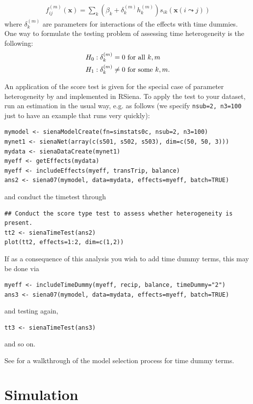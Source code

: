 \documentclass[a4paper,fleqn]{article}
\newcommand{\+}{\, + \,}
\begin{document}
{\begin{align}
f^{(m)}_{ij}(\mathbf{x})= \sum_k (\beta_k + \delta_k^{(m)} h_k^{(m)})
s_{ik}(\mathbf{x}(i \leadsto j))
\label{eq:fmij}
\end{align}
where $\delta_k^{(m)}$ are parameters for interactions of the effects
with time dummies. One way
to formulate the testing problem of assessing time heterogeneity is the
following:
\begin{align}
H_0:\delta_k^{(m)} = 0 & \mbox{~for all~} k,m \notag\\
H_1:\delta_k^{(m)} \neq 0 & \mbox{ for some } k,m .
\label{hyptest}
\end{align}

An application of the score test is given for the special case of parameter
heterogeneity by \citet{Lospinoso2010a} and implemented in RSiena.  To apply the
test to your dataset, run an estimation in the usual way, e.g. as follows
(we specify \texttt{nsub=2, n3=100} just to have an example that runs
very quickly):
\begin{verbatim}
mymodel <- sienaModelCreate(fn=simstats0c, nsub=2, n3=100)
mynet1 <- sienaNet(array(c(s501, s502, s503), dim=c(50, 50, 3)))
mydata <- sienaDataCreate(mynet1)
myeff <- getEffects(mydata)
myeff <- includeEffects(myeff, transTrip, balance)
ans2 <- siena07(mymodel, data=mydata, effects=myeff, batch=TRUE)
\end{verbatim}
and conduct the timetest through
\begin{verbatim}
## Conduct the score type test to assess whether heterogeneity is present.
tt2 <- sienaTimeTest(ans2)
plot(tt2, effects=1:2, dim=c(1,2))
\end{verbatim}
If as a consequence of this analysis you wish to add time dummy terms,
this may be done via
\begin{verbatim}
myeff <- includeTimeDummy(myeff, recip, balance, timeDummy="2")
ans3 <- siena07(mymodel, data=mydata, effects=myeff, batch=TRUE)
\end{verbatim}
and testing again,
\begin{verbatim}
tt3 <- sienaTimeTest(ans3)
\end{verbatim}
and so on.

See \citet{Lospinoso2010b} for a walkthrough of the model selection process
for time dummy terms.

\begin{print}
\newpage
\end{print}
\section{Simulation}

}
\end{document}
